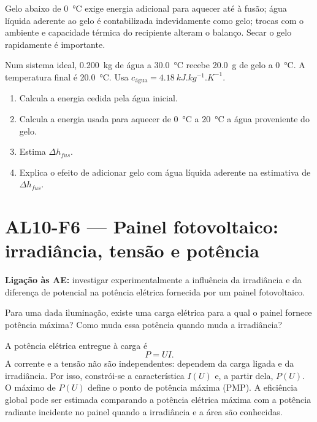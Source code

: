 \documentclass[11pt,a4paper,openany]{book}
\newcounter{exercicio}[chapter]
\renewcommand{\theexercicio}{\thechapter.\arabic{exercicio}}
\newenvironment{exercicio}[1][]%
{\refstepcounter{exercicio}%
\begin{tcolorbox}[breakable,colback=white,colframe=eublue!70,
 title={Exercício \theexercicio\if\relax\detokenize{#1}\relax\else\ --- #1\fi},fonttitle=\bfseries]}%
{\end{tcolorbox}}
\newcommand{\LigAE}[1]{\textbf{Ligação às AE:} #1}
\begin{document}
\begin{erros}
Gelo abaixo de \SI{0}{\celsius} exige energia adicional para aquecer até à fusão; água líquida aderente ao gelo é contabilizada indevidamente como gelo; trocas com o ambiente e capacidade térmica do recipiente alteram o balanço. Secar o gelo rapidamente é importante.
\end{erros}

\begin{exercicio}[Balanço energético com gelo]
Num sistema ideal, \SI{0.200}{kg} de água a \SI{30.0}{\celsius} recebe \SI{20.0}{g} de gelo a \SI{0}{\celsius}. A temperatura final é \SI{20.0}{\celsius}. Usa $c_{\text{água}}=\SI{4.18}{kJ.kg^{-1}.K^{-1}}$.
\begin{enumerate}[label=\alph*)]
\item Calcula a energia cedida pela água inicial.
\item Calcula a energia usada para aquecer de \SI{0}{\celsius} a \SI{20}{\celsius} a água proveniente do gelo.
\item Estima $\Delta h_{fus}$.
\item Explica o efeito de adicionar gelo com água líquida aderente na estimativa de $\Delta h_{fus}$.
\end{enumerate}
\end{exercicio}

\section{AL10-F6 — Painel fotovoltaico: irradiância, tensão e potência}
\LigAE{investigar experimentalmente a influência da irradiância e da diferença de potencial na potência elétrica fornecida por um painel fotovoltaico.}

\begin{questao}
Para uma dada iluminação, existe uma carga elétrica para a qual o painel fornece potência máxima? Como muda essa potência quando muda a irradiância?
\end{questao}

\begin{fundamento}
A potência elétrica entregue à carga é
\[
P=UI.
\]
A corrente e a tensão não são independentes: dependem da carga ligada e da irradiância. Por isso, constrói-se a característica $I(U)$ e, a partir dela, $P(U)$. O máximo de $P(U)$ define o ponto de potência máxima (PMP). A eficiência global pode ser estimada comparando a potência elétrica máxima com a potência radiante incidente no painel quando a irradiância e a área são conhecidas.
\end{fundamento}
\end{document}
